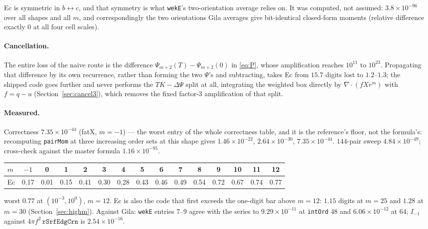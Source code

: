 \documentclass[11pt]{article}
\theoremstyle{remark}
\newcommand{\code}[1]{\texttt{#1}}
\begin{document}
Ec is symmetric in $b\leftrightarrow c$, and that symmetry is what \code{wekE}'s
two-orientation average relies on. It was computed, not assumed: $3.8\times10^{-96}$ over
all shapes and all $m$, and correspondingly the two orientations Gila averages give
bit-identical closed-form moments (relative difference exactly $0$ at all four cell scales).

\paragraph{Cancellation.} The entire loss of the naive route is the difference
$\Psi_{m+2}(T) - \Psi_{m+2}(0)$ in \eqref{eq:P}, whose amplification reaches $10^{11}$ to
$10^{23}$. Propagating that difference by its own recurrence, rather than forming the two
$\Psi$'s and subtracting, takes Ec from $15.7$ digits lost to $1.2$--$1.3$; the shipped
code goes further and never performs the $TK - \Delta\Psi$ split at all, integrating the
weighted box directly by $\nabla\cdot(f X r^m)$ with $f = q-u$ (Section~\ref{sec:cancel3}),
which removes the fixed factor-3 amplification of that split.

\paragraph{Measured.} Correctness $7.35\times10^{-44}$ (fatX, $m=-1$) --- the worst entry
of the whole correctness table, and it is the reference's floor, not the formula's:
recomputing \code{pairMom} at three increasing order sets at this shape gives
$1.46\times10^{-22}$, $2.64\times10^{-30}$, $7.35\times10^{-44}$. $144$-pair sweep
$4.84\times10^{-49}$; cross-check against the master formula $1.16\times10^{-95}$.

\begin{center}\small
\begin{tabular}{@{}lcccccccccccccc@{}}
\toprule
$m$ & $-1$ & 0 & 1 & 2 & 3 & 4 & 5 & 6 & 7 & 8 & 9 & 10 & 11 & 12\\
\midrule
Ec & 0.17 & 0.01 & 0.15 & 0.41 & 0.30 & 0.28 & 0.43 & 0.46 & 0.49 & 0.54 & 0.72 & 0.67 & 0.74 & 0.77\\
\bottomrule
\end{tabular}
\end{center}
\noindent
worst $0.77$ at $(10^{-3}, 10^{0})$, $m = 12$. Ec is also the code that first exceeds the
one-digit bar above $m = 12$: $1.15$ digits at $m = 25$ and $1.28$ at $m = 30$
(Section~\ref{sec:highm}). Against Gila: \code{wekE} entries 7--9 agree with the series to
$9.29\times10^{-11}$ at \code{intOrd} $48$ and $6.06\times10^{-12}$ at $64$; $I_{-1}$
against $4\pi f^2\,\code{rSrfEdgCrn}$ is $2.54\times10^{-16}$.
\end{document}
